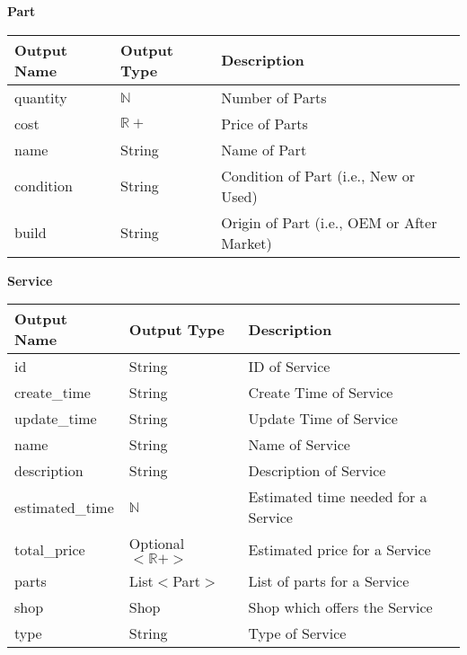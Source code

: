 \documentclass[12pt, titlepage]{article}
\begin{document}
\textbf{Part}

\begin{table}[H]
	\begin{tabular}{|p{}|p{}|p{}|}
		\hline
		\textbf{Output Name} & \textbf{Output Type} & \textbf{Description}                       \\
		\hline
		quantity             & $\mathbb{N}$         & Number of Parts                            \\
		\hline
		cost                 & $\mathbb{R}+$        & Price of Parts                             \\
		\hline
		name                 & String               & Name of Part                               \\
		\hline
		condition            & String               & Condition of Part  (i.e., New or Used)     \\
		\hline
		build                & String               & Origin of Part (i.e., OEM or After Market) \\
		\hline
	\end{tabular}
\end{table}

\textbf{Service}

\begin{table}[H]
	\begin{tabular}{|p{}|p{}|p{}|}
		\hline
		\textbf{Output Name} & \textbf{Output Type}    & \textbf{Description}                \\
		\hline
		id                   & String                  & ID of Service                       \\
		\hline
		create\_time         & String                  & Create Time of Service              \\
		\hline
		update\_time         & String                  & Update Time of Service              \\
		\hline
		name                 & String                  & Name of Service                     \\
		\hline
		description          & String                  & Description of Service              \\
		\hline
		estimated\_time      & $\mathbb{N}$            & Estimated time needed for a Service \\
		\hline
		total\_price         & Optional$<\mathbb{R}+>$ & Estimated price for a Service       \\
		\hline
		parts                & List$<$Part$>$          & List of parts for a Service         \\
		\hline
		shop                 & Shop                    & Shop which offers the Service       \\
		\hline
		type                 & String                  & Type of Service                     \\
		\hline
	\end{tabular}
\end{table}
\end{document}
